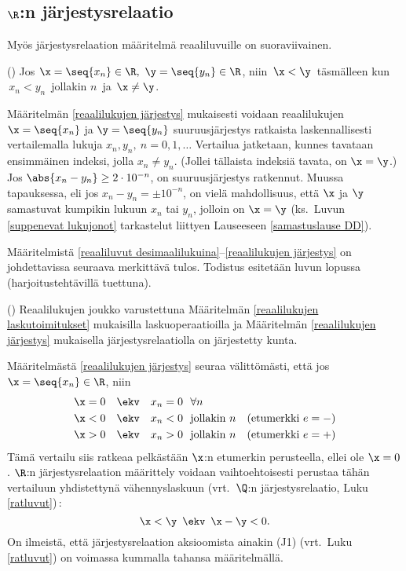 \subsection*{$\R$:n järjestysrelaatio}

Myös järjestysrelaation määritelmä reaaliluvuille on suoraviivainen. 
\begin{Def} \label{reaalilukujen järjestys} 
() Jos $\x=\seq{x_n}\in\R,\ \y=\seq{y_n}\in\R$, niin
$\,\x<\y\,$ täsmälleen kun $\,x_n<y_n\,$ jollakin $n\,$ ja $\,\x\neq\y$.
\end{Def}
Määritelmän \ref{reaalilukujen järjestys} mukaisesti voidaan reaalilukujen
$\x=\seq{x_n}$ ja $\y=\seq{y_n}$ suuruusjärjestys ratkaista laskennallisesti vertailemalla
lukuja $x_n,y_n,\ n=0,1,\ldots$ Vertailua jatketaan, kunnes tavataan ensimmäinen indeksi, 
jolla $x_n \neq y_n$. (Jollei tällaista indeksiä tavata, on $\x=\y$.) Jos 
$\abs{x_n-y_n} \ge 2 \cdot 10^{-n}$, on suuruusjärjestys ratkennut. Muussa tapauksessa,
eli jos $x_n-y_n = \pm 10^{-n}$, on vielä mahdollisuus, että $\x$ ja $\y$ samastuvat
kumpikin lukuun $x_n$ tai $y_n$, jolloin on $\x=\y$ (ks.\ Luvun \ref{suppenevat lukujonot}
tarkastelut liittyen Lauseeseen \ref{samastuslause DD}).

Määritelmistä \ref{reaaliluvut desimaalilukuina}--\ref{reaalilukujen järjestys} on
johdettavissa seuraava merkittävä tulos. Todistus esitetään luvun lopussa
(harjoitustehtävillä tuettuna).
\begin{*Lause} \label{R on kunta} ()
Reaalilukujen joukko varustettuna Määritelmän \ref{reaalilukujen laskutoimitukset}
mukaisilla laskuoperaatioilla ja Määritelmän \ref{reaalilukujen järjestys} mukaisella
järjestysrelaatiolla on järjestetty kunta. 
\end{*Lause}

Määritelmästä \ref{reaalilukujen järjestys} seuraa välittömästi, että jos
$\x = \seq{x_n} \in \R$, niin
\begin{align*}
\x = 0 \quad &\ekv \quad x_n = 0\ \ \forall n \\
\x < 0 \quad &\ekv \quad x_n < 0\ \ \text{jollakin}\ n \quad (\text{etumerkki}\ e = - ) \\
\x > 0 \quad &\ekv \quad x_n > 0\ \ \text{jollakin}\ n \quad (\text{etumerkki}\ e = + )
\end{align*}
Tämä vertailu siis ratkeaa pelkästään $\x$:n etumerkin perusteella, ellei ole $\x=0$. $\R$:n
järjestysrelaation määrittely voidaan vaihtoehtoisesti perustaa tähän vertailuun yhdistettynä
vähennyslaskuun (vrt.\ $\Q$:n järjestysrelaatio, Luku \ref{ratluvut})\,:
\[
\x<\y \,\ \ekv \,\ \x-\y<0.
\]
On ilmeistä, että järjestysrelaation aksioomista ainakin (J1) (vrt.\ Luku \ref{ratluvut})
on voimassa kummalla tahansa määritelmällä. 

